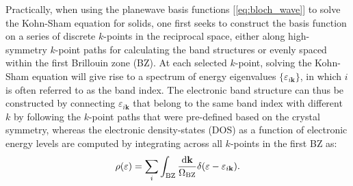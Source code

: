 Practically, when using the planewave basis functions [\cref{eq:bloch_wave}] to solve the Kohn-Sham equation for solids, one first seeks to construct the basis function on a series of discrete $k$-points in the reciprocal space, either along high-symmetry $k$-point paths for calculating the band structures or evenly spaced within the first Brillouin zone (BZ). At each selected $k$-point, solving the Kohn-Sham equation will give rise to a spectrum of energy eigenvalues $\{\varepsilon_{i\bm{k}}\}$, in which $i$ is often referred to as the band index. The electronic band structure can thus be constructed by connecting $\varepsilon_{i\bm{k}}$ that belong to the same band index with different $k$ by following the  $k$-point paths that were pre-defined based on the crystal symmetry, whereas the electronic density-states (DOS) as a function of electronic energy levels are computed by integrating across all $k$-points in the first BZ as:
\begin{equation}
    \label{eq:electronic_DOS}
    \rho(\varepsilon)=\sum_i\int_{\mbox{\scriptsize{BZ}}} \frac{\mbox{d}\mathbf{k}}{\Omega_{\mbox{\scriptsize{BZ}}}}\delta(\varepsilon-\varepsilon_{i\mathbf{k}}).
\end{equation}
